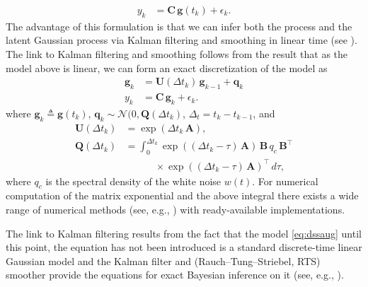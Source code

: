 \documentclass[journal]{IEEEtran}
\newcommand{\mauricio}[1]{{\color{blue}#1}}
\begin{document}
%
\begin{equation}
\begin{split}
  y_k &= \mathbf{C} \, \mathbf{g}(t_k) + \epsilon_k.
\end{split}
\label{eq:ssaugkf}
\end{equation}
%
The advantage of this formulation is that we can infer both the process and the latent Gaussian process via Kalman
filtering and smoothing in linear time (see \cite{Hartikainen+Sarkka:2010,Sarkka+Solin+Hartikainen:2013}). The link to
Kalman filtering and smoothing follows from the result that as the model above is linear, we can form an exact
discretization of the model as
%
\begin{equation}
\begin{split}
  \mathbf{g}_k
  &= \mathbf{U}(\Delta t_k) \, \mathbf{g}_{k-1}
  + \mathbf{q}_k \\
  y_k &= \mathbf{C} \, \mathbf{g}_k + \epsilon_k.
\end{split}
\label{eq:dssaug}
\end{equation}
%
where $\mathbf{g}_k \triangleq \mathbf{g}(t_k)$, $\mathbf{q}_k \sim \mathcal{N}(0,\mathbf{Q}(\Delta t_k)$, $\Delta_t = t_k - t_{k-1}$, and
%
\begin{equation}
\begin{split}
  \mathbf{U}(\Delta t_k)  &= \exp(\Delta t_k \, \mathbf{A}), \\
  \mathbf{Q}(\Delta t_k) &= \int_0^{\Delta t_k} \exp((\Delta t_k - \tau) \, \mathbf{A}) \,
  \mathbf{B} \, q_c  \, \mathbf{B}^{\top} \\
  &\qquad \quad \times \exp((\Delta t_k - \tau) \, \mathbf{A})^{\top} \, d\tau,
\end{split}
\label{eq:dssaug}
\end{equation}
%
where $q_c$ is the spectral density of the white noise $w(t)$. For numerical computation of the matrix exponential and the above integral there exists a wide range of numerical methods (see, e.g., \cite{Grewal+Andrews:2001,Sarkka:2006}) with ready-available implementations.

The link to Kalman filtering results from the fact that the model \mauricio{\eqref{eq:dssaug} until this point, the
  equation has not been introduced} is a standard discrete-time linear Gaussian model and the Kalman filter and (Rauch--Tung--Striebel, RTS) smoother provide the equations for exact Bayesian inference on it (see, e.g., \cite{Sarkka:2013}). 
\end{document}
